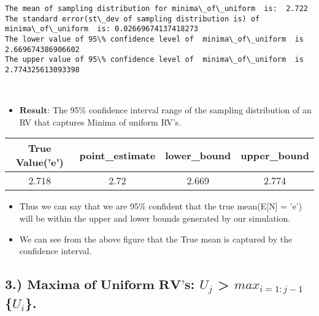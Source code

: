 \documentclass[11pt]{article}
\providecommand{\tightlist}{%
      \setlength{\itemsep}{0pt}\setlength{\parskip}{0pt}}
\begin{document}
    \begin{Verbatim}[commandchars=\\\{\}]
The mean of sampling distribution for minima\_of\_uniform  is:  2.722
The standard error(st\_dev of sampling distribution is) of  minima\_of\_uniform  is: 0.02669674137418273
The lower value of 95\% confidence level of  minima\_of\_uniform  is 2.669674386906602
The upper value of 95\% confidence level of  minima\_of\_uniform  is 2.774325613093398

    \end{Verbatim}

    \begin{center}
    \end{center}
    { \hspace*{\fill} \\}
    
    \begin{itemize}
\tightlist
\item
  \(\textbf{Result}\): The 95\% confidence interval range of the
  sampling distribution of an RV that captures Minima of uniform RV's.
\end{itemize}

\begin{longtable}[]{@{}cccc@{}}
\toprule
True Value('e') & point\_estimate & lower\_bound &
upper\_bound\tabularnewline
\midrule
\endhead
2.718 & 2.72 & 2.669 & 2.774\tabularnewline
\bottomrule
\end{longtable}

\begin{itemize}
\item
  Thus we can say that we are 95\% confident that the true mean(E{[}N{]}
  = 'e') will be within the upper and lower bounds generated by our
  simulation.
\item
  We can see from the above figure that the True mean is captured by the
  confidence interval.
\end{itemize}

    \subsection{\texorpdfstring{3.) \(\textbf{Maxima of Uniform RV's}\):
\(U_j\) \textgreater{} \(max_{i=1:j-1}\)
\{\(U_i\)\}.}{3.) \textbackslash{}textbf\{Maxima of Uniform RV's\}: U\_j \textgreater{} max\_\{i=1:j-1\} \{U\_i\}.}}\label{textbfmaxima-of-uniform-rvs-u_j-max_i1j-1-u_i.}
\end{document}

